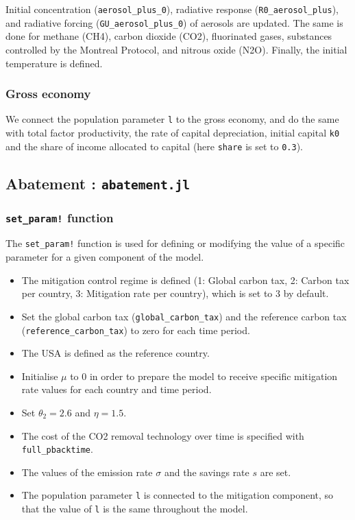 \documentclass[
]{article}
\providecommand{\tightlist}{%
  \setlength{\itemsep}{0pt}\setlength{\parskip}{0pt}}
\begin{document}
Initial concentration (\texttt{aerosol\_plus\_0}), radiative response
(\texttt{R0\_aerosol\_plus}), and radiative forcing
(\texttt{GU\_aerosol\_plus\_0}) of aerosols are updated. The same is
done for methane (CH4), carbon dioxide (CO2), fluorinated gases,
substances controlled by the Montreal Protocol, and nitrous oxide (N2O).
Finally, the initial temperature is defined.

\subsubsection{Gross economy}\label{gross-economy}

We connect the population parameter \texttt{l} to the gross economy, and
do the same with total factor productivity, the rate of capital
depreciation, initial capital \texttt{k0} and the share of income
allocated to capital (here \texttt{share} is set to \texttt{0.3}).

\subsection{\texorpdfstring{Abatement :
\texttt{abatement.jl}}{Abatement : abatement.jl}}\label{abatement-abatement.jl}

\subsubsection{\texorpdfstring{\texttt{set\_param!}
function}{set\_param! function}}\label{set_param-function}

The \texttt{set\_param!} function is used for defining or modifying the value
of a specific parameter for a given component of the model.

\begin{itemize}
\tightlist
\item
  The mitigation control regime is defined (1: Global carbon tax, 2:
  Carbon tax per country, 3: Mitigation rate per country), which is set
  to 3 by default.
\item
  Set the global carbon tax (\texttt{global\_carbon\_tax}) and the
  reference carbon tax (\texttt{reference\_carbon\_tax}) to zero for
  each time period.
\item
  The USA is defined as the reference country.
\item
  Initialise \(\mu\) to 0 in order to prepare the model to receive
  specific mitigation rate values for each country and time period.
\item
  Set \(\theta_2 = 2.6\) and \(\eta = 1.5\).
\item
  The cost of the CO2 removal technology over time is specified with
  \texttt{full\_pbacktime}.
\item
  The values of the emission rate \(\sigma\) and the savings rate \(s\)
  are set.
\item
  The population parameter \texttt{l} is connected to the mitigation
  component, so that the value of \texttt{l} is the same throughout the
  model.
\end{itemize}
\end{document}
